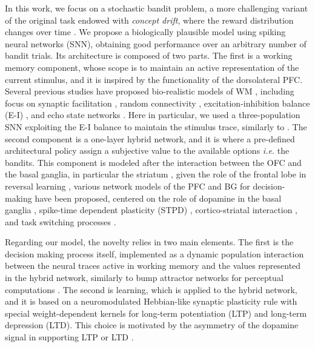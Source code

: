 In this work, we focus on a stochastic bandit problem, a more challenging variant of the original task endowed with \textit{concept drift}, where the reward distribution changes over time \cite{garivierUpperConfidenceBoundPolicies2008, besbesStochasticMultiArmedBanditProblem2014, cavenaghiNonStationaryMultiArmed2021}.
We propose a biologically plausible model using spiking neural networks (SNN), obtaining good performance over an arbitrary number of bandit trials.
Its architecture is composed of two parts. The first is a working memory component, whose scope is to maintain an active representation of the current stimulus, and it is inspired by the functionality of the dorsolateral PFC. Several previous studies have proposed bio-realistic models of WM
\cite{barakWorkingModelsWorking2014}, including focus on synaptic facilitation \cite{barakNeuronalPopulationCoding2010}, random connectivity \cite{bouchacourtFlexibleModelWorking2019}, excitation-inhibition balance (E-I)
\cite{brunelEffectsNeuromodulationCortical2001, vogelsGatingMultipleSignals2009}, and echo state networks \cite{pascanuNeurodynamicalModelWorking2011, fetteShortTermMemory2005}. Here in particular, we used a three-population SNN exploiting the E-I balance to maintain the stimulus trace, similarly to
\cite{chenSpikingNeuralNetwork2023}.
The second component is a one-layer hybrid network, and it is where a pre-defined architectural policy assign a subjective value to the available options \textit{i.e.} the bandits.
This component is modeled after the interaction between the OFC and the basal ganglia, in particular the striatum
\cite{bariDynamicDecisionMaking2021, frankAnatomyDecisionStriatoorbitofrontal2006}, given the role of the frontal lobe in reversal learning \cite{bartoloPrefrontalCortexPredicts2020},
various network models of the PFC and BG for decision-making have been proposed, centered on the role of dopamine in the basal ganglia \cite{bastonBiologicallyInspiredComputational2015}, spike-time dependent plasticity (STPD) \cite{kannanUnsupervisedSpikingNeural2023}, cortico-striatal interaction
\cite{frankInteractionsFrontalCortex2001}, and task switching processes \cite{zhaoBrainInspiredDecisionMakingSpiking2018, herdNeuralNetworkModel2014}.

Regarding our model, the novelty relies in two main elements. The first is the decision making process itself, implemented as a dynamic population interaction between the neural traces active in working memory and the values represented in the hybrid network, similarly to bump attractor networks for
perceptual computations \cite{carrollEncodingCertaintyBump2014, esnaola-acebesBumpAttractorDynamics2021}.
The second is learning, which is applied to the hybrid network, and it is based on a neuromodulated Hebbian-like synaptic plasticity rule with special weight-dependent kernels for long-term potentiation (LTP) and long-term depression (LTD).
This choice is motivated by the asymmetry of the dopamine signal in supporting LTP or LTD \cite{schultzNeuralSubstratePrediction1997, toblerAdaptiveCodingReward2005, reynoldsDopaminedependentPlasticityCorticostriatal2002, madadiaslDopaminergicModulationSynaptic2019}.


